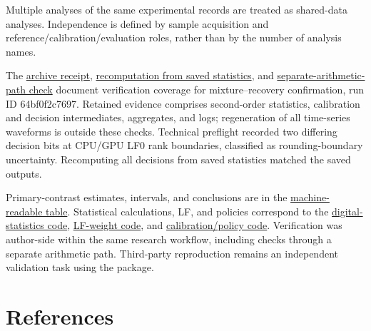 \documentclass[10pt,a4paper]{article}
\begin{document}
Multiple analyses of the same experimental records are treated as shared-data analyses. Independence is defined by sample acquisition and reference/calibration/evaluation roles, rather than by the number of analysis names.

The \href{https://github.com/metaSATOKEN/First-Order-Probes/blob/789f3c83bc85511d9e7a65f083c5806f2d36e8f2/numerics/analysis/pr0012_64bf0f2c7697_confirmation_v1/receipt.json}{archive receipt}, \href{https://github.com/metaSATOKEN/First-Order-Probes/blob/789f3c83bc85511d9e7a65f083c5806f2d36e8f2/numerics/analysis/pr0012_64bf0f2c7697_confirmation_v1/validation.json}{recomputation from saved statistics}, and \href{https://github.com/metaSATOKEN/First-Order-Probes/blob/789f3c83bc85511d9e7a65f083c5806f2d36e8f2/numerics/analysis/pr0012_64bf0f2c7697_confirmation_v1/second_path_validation.json}{separate-arithmetic-path check} document verification coverage for mixture–recovery confirmation, run ID 64bf0f2c7697. Retained evidence comprises second-order statistics, calibration and decision intermediates, aggregates, and logs; regeneration of all time-series waveforms is outside these checks. Technical preflight recorded two differing decision bits at CPU/GPU LF0 rank boundaries, classified as rounding-boundary uncertainty. Recomputing all decisions from saved statistics matched the saved outputs.

Primary-contrast estimates, intervals, and conclusions are in the \href{https://github.com/metaSATOKEN/First-Order-Probes/blob/789f3c83bc85511d9e7a65f083c5806f2d36e8f2/numerics/analysis/pr0012_64bf0f2c7697_confirmation_v1/primary13.json}{machine-readable table}. Statistical calculations, LF, and policies correspond to the \href{https://github.com/metaSATOKEN/First-Order-Probes/blob/789f3c83bc85511d9e7a65f083c5806f2d36e8f2/numerics/scripts/probe_backend_check_v1.py}{digital-statistics code}, \href{https://github.com/metaSATOKEN/First-Order-Probes/blob/789f3c83bc85511d9e7a65f083c5806f2d36e8f2/numerics/scripts/pr0004_methods.py}{LF-weight code}, and \href{https://github.com/metaSATOKEN/First-Order-Probes/blob/789f3c83bc85511d9e7a65f083c5806f2d36e8f2/numerics/scripts/pr0012_methods.py}{calibration/policy code}. Verification was author-side within the same research workflow, including checks through a separate arithmetic path. Third-party reproduction remains an independent validation task using the package.

\clearpage

\section{References}
\end{document}
